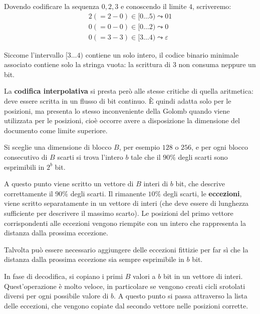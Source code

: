 \documentclass[\main/main.tex]{subfiles}
\begin{document}
\begin{multicols}{2}
\begin{definition}
\end{definition}
\begin{example}
    Dovendo codificare la sequenza \(0,2,3\) e conoscendo il limite \(4\), scriveremo:
    \begin{align*}
        2(=2-0) \in[0 \ldots 5) \leadsto 01\\
        0(=0-0) \in[0 \ldots 2) \leadsto 0\\
        0(=3-3) \in[3 \ldots 4) \leadsto \varepsilon
    \end{align*}
\end{example}
\begin{example}
    Siccome l'intervallo \([3\ldots 4)\) contiene un solo intero, il codice binario minimale associato contiene solo la stringa vuota: la scrittura di \(3\) non consuma neppure un bit.
\end{example}
\begin{observation}
    La \textbf{codifica interpolativa} si presta però alle stesse critiche di quella aritmetica: deve essere scritta in un flusso di bit continuo. È quindi adatta solo per le posizioni, ma presenta lo stesso inconveniente della Golomb quando viene utilizzata per le posizioni, cioè occorre avere a disposizione la dimensione del documento come limite superiore.
\end{observation}
\begin{definition}
    Si sceglie una dimensione di blocco \(B\), per esempio \(128\) o \(256\), e per ogni blocco consecutivo di \(B\) scarti si trova l'intero \(b\) tale che il \(90\%\) degli scarti sono esprimibili in \(2^b\) bit. 
    
    A questo punto viene scritto un vettore di \(B\) interi di \(b\) bit, che descrive correttamente il \(90\%\) degli scarti. Il rimanente \(10\%\) degli scarti, le \textbf{eccezioni}, viene scritto separatamente in un vettore di interi (che deve essere di lunghezza sufficiente per descrivere il massimo scarto). Le posizioni del primo vettore corrispondenti alle eccezioni vengono riempite con un intero che rappresenta la distanza dalla prossima eccezione.
    
    Talvolta può essere necessario aggiungere delle eccezioni fittizie per far sì che la distanza dalla prossima eccezione sia sempre esprimibile in \(b\) bit.
    
    In fase di decodifica, si copiano i primi \(B\) valori a \(b\) bit in un vettore di interi. Quest'operazione è molto veloce, in particolare se vengono creati cicli srotolati diversi per ogni possibile valore di \(b\). A questo punto si passa attraverso la lista delle eccezioni, che vengono copiate dal secondo vettore nelle posizioni corrette.
    

\end{definition}
\end{multicols}
\end{document}
